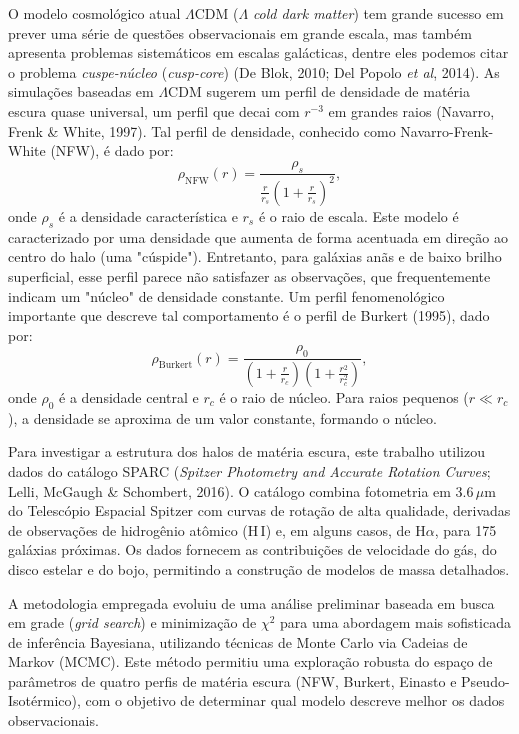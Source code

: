 \documentclass[a4paper]{article}
\begin{document}
O modelo cosmológico atual $\Lambda$CDM ($\Lambda$ \textit{cold dark matter}) tem grande sucesso em prever uma série de questões observacionais em grande escala, mas também apresenta problemas sistemáticos em escalas galácticas, dentre eles podemos citar o problema \textit{cuspe-núcleo} (\textit{cusp-core}) (De Blok, 2010; Del Popolo \textit{et al}, 2014). As simulações baseadas em $\Lambda$CDM sugerem um perfil de densidade de matéria escura quase universal, um perfil que decai com $r^{-3}$ em grandes raios (Navarro, Frenk \& White, 1997). Tal perfil de densidade, conhecido como Navarro-Frenk-White (NFW), é dado por:
\begin{equation}
\rho_{\text{NFW}}(r) = \frac{\rho_s}{\frac{r}{r_s} \left(1 + \frac{r}{r_s}\right)^2},
\end{equation}
onde $\rho_s$ é a densidade característica e $r_s$ é o raio de escala. Este modelo é caracterizado por uma densidade que aumenta de forma acentuada em direção ao centro do halo (uma "cúspide"). Entretanto, para galáxias anãs e de baixo brilho superficial, esse perfil parece não satisfazer as observações, que frequentemente indicam um "núcleo" de densidade constante. Um perfil fenomenológico importante que descreve tal comportamento é o perfil de Burkert (1995), dado por:
\begin{equation}
\rho_{\text{Burkert}}(r) = \frac{\rho_0}{\left(1 + \frac{r}{r_c}\right)\left(1 + \frac{r^2}{r_c^2}\right)},
\end{equation}
onde $\rho_0$ é a densidade central e $r_c$ é o raio de núcleo. Para raios pequenos ($r\ll r_c$), a densidade se aproxima de um valor constante, formando o núcleo.

Para investigar a estrutura dos halos de matéria escura, este trabalho utilizou dados do catálogo SPARC (\textit{Spitzer Photometry and Accurate Rotation Curves}; Lelli, McGaugh \& Schombert, 2016). O catálogo combina fotometria em $3.6\,\mu$m do Telescópio Espacial Spitzer com curvas de rotação de alta qualidade, derivadas de observações de hidrogênio atômico (H\,I) e, em alguns casos, de H$\alpha$, para 175 galáxias próximas. Os dados fornecem as contribuições de velocidade do gás, do disco estelar e do bojo, permitindo a construção de modelos de massa detalhados.

A metodologia empregada evoluiu de uma análise preliminar baseada em busca em grade (\textit{grid search}) e minimização de $\chi^2$ para uma abordagem mais sofisticada de inferência Bayesiana, utilizando técnicas de Monte Carlo via Cadeias de Markov (MCMC). Este método permitiu uma exploração robusta do espaço de parâmetros de quatro perfis de matéria escura (NFW, Burkert, Einasto e Pseudo-Isotérmico), com o objetivo de determinar qual modelo descreve melhor os dados observacionais.
\end{document}
